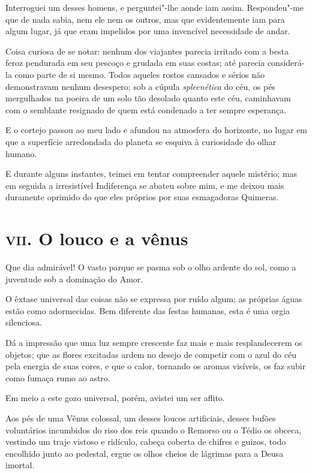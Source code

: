 Interroguei um desses homens, e perguntei"-lhe aonde iam assim.
Respondeu"-me que de nada sabia, nem ele nem os outros, mas que
evidentemente iam para algum lugar, já que eram impelidos por uma invencível
necessidade de andar.

Coisa curiosa de se notar: nenhum dos viajantes parecia irritado com a
besta feroz pendurada em seu pescoço e grudada em suas costas;
até parecia considerá-la como parte de si mesmo. Todos
aqueles rostos cansados e sérios não demonstravam nenhum desespero; sob a
cúpula \textit{spleenética} do céu, os pés mergulhados na poeira de um solo
tão desolado quanto este céu, caminhavam com o semblante
resignado de quem está condenado a ter sempre esperança.

E o cortejo passou ao meu lado e afundou na atmosfera do horizonte, no
lugar em que a superfície arredondada do planeta se esquiva à
curiosidade do olhar humano.

E durante alguns instantes, teimei em tentar compreender aquele mistério;
mas em seguida a irresistível Indiferença se abateu sobre mim, e me
deixou mais duramente oprimido do que eles próprios por suas
esmagadoras Quimeras.

\chapter{\textsc{vii.} O louco e a vênus}

Que dia admirável! O vasto parque se pasma sob o olho ardente do sol,
como a juventude sob a dominação do Amor.

O êxtase universal das coisas não se expressa por ruído algum; as
próprias águas estão como adormecidas. Bem diferente das festas
humanas, esta é uma orgia silenciosa.

Dá a impressão que uma luz sempre crescente faz mais e mais
resplandecerem os objetos; que as flores excitadas ardem no desejo de
competir com o azul do céu pela energia de suas cores, e que o calor,
tornando os aromas visíveis, os faz subir como fumaça rumo ao astro.

Em meio a este gozo universal, porém, avistei um ser aflito.

Aos pés de uma Vênus colossal, um desses loucos artificiais, desses
bufões voluntários incumbidos do riso dos reis quando o Remorso ou o
Tédio os obceca, vestindo um traje vistoso e ridículo, cabeça
coberta de chifres e guizos, todo encolhido junto ao pedestal, ergue os
olhos cheios de lágrimas para a Deusa imortal.

